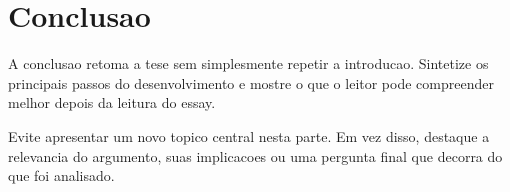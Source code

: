 \section{Conclusao}

A conclusao retoma a tese sem simplesmente repetir a introducao. Sintetize os
principais passos do desenvolvimento e mostre o que o leitor pode compreender
melhor depois da leitura do essay.

Evite apresentar um novo topico central nesta parte. Em vez disso, destaque a
relevancia do argumento, suas implicacoes ou uma pergunta final que decorra do
que foi analisado.
